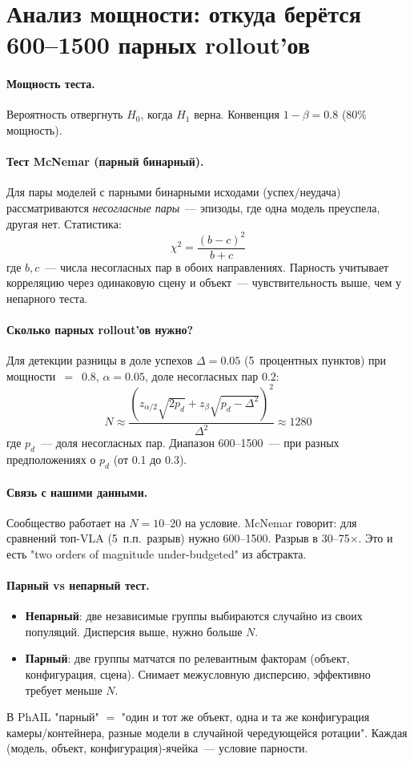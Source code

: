 \documentclass[11pt]{article}
\begin{document}
\section{Анализ мощности: откуда берётся 600--1500 парных rollout'ов}

\paragraph{Мощность теста.} Вероятность отвергнуть $H_0$, когда $H_1$ верна. Конвенция $1-\beta = 0.8$ (80\% мощность).

\paragraph{Тест McNemar (парный бинарный).} Для пары моделей с парными бинарными исходами (успех/неудача) рассматриваются \emph{несогласные пары}~--- эпизоды, где одна модель преуспела, другая нет. Статистика:
\[
\chi^2 = \frac{(b - c)^2}{b + c}
\]
где $b, c$~--- числа несогласных пар в обоих направлениях. Парность учитывает корреляцию через одинаковую сцену и объект~--- чувствительность выше, чем у непарного теста.

\paragraph{Сколько парных rollout'ов нужно?} Для детекции разницы в доле успехов $\Delta = 0.05$ (5~процентных пунктов) при мощности~$=$~0.8, $\alpha=0.05$, доле несогласных пар $0.2$:
\[
N \approx \frac{(z_{\alpha/2}\sqrt{2p_d} + z_\beta\sqrt{p_d - \Delta^2})^2}{\Delta^2} \approx 1280
\]
где $p_d$~--- доля несогласных пар. Диапазон 600--1500~--- при разных предположениях о $p_d$ (от 0.1 до 0.3).

\paragraph{Связь с нашими данными.} Сообщество работает на $N = 10$--$20$ на условие. McNemar говорит: для сравнений топ-VLA (5~п.п.\ разрыв) нужно 600--1500. Разрыв в 30--75$\times$. Это и есть "two orders of magnitude under-budgeted" из абстракта.

\paragraph{Парный vs непарный тест.}
\begin{itemize}[leftmargin=2em, itemsep=1pt]
\item \textbf{Непарный}: две независимые группы выбираются случайно из своих популяций. Дисперсия выше, нужно больше $N$.
\item \textbf{Парный}: две группы матчатся по релевантным факторам (объект, конфигурация, сцена). Снимает межусловную дисперсию, эффективно требует меньше $N$.
\end{itemize}
В PhAIL "парный" $=$ "один и тот же объект, одна и та же конфигурация камеры/контейнера, разные модели в случайной чередующейся ротации". Каждая (модель, объект, конфигурация)-ячейка~--- условие парности.
\end{document}
